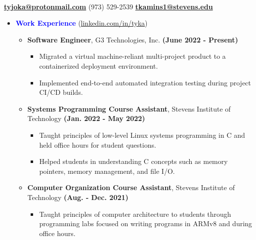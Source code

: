 \documentclass[11pt]{article}
\begin{document}
\begin{flushleft}

    \makebox[\textwidth]{\LARGE \textbf{\textcolor{teal}{Tyler Kaminski}}}\\

\setlength{\parindent}{0.5in}

\begin{multicols}{2}
    \textbf{\href{mailto:tyjoka@protonmail.com}{tyjoka@protonmail.com}} \textemdash{} (973) 529-2539
    \textbf{\href{mailto:tkamins1@stevens.edu}{tkamins1@stevens.edu}}
\end{multicols}

\begin{itemize}
    \item[] \Large \textcolor{blue}{\textbf{Work Experience}} (\href{https://linkedin.com/in/tyka}{linkedin.com/in/tyka}) \normalsize
        \begin{itemize}
            \item \textbf{Software Engineer}, G3 Technologies, Inc. \hfill{\textbf{(June 2022 - Present)}}
                \begin{itemize}
                    \item Migrated a virtual machine-reliant multi-project product to a containerized deployment environment.
                    \item Implemented end-to-end automated integration testing during project CI/CD builds.
                \end{itemize}
            \item \textbf{Systems Programming Course Assistant}, Stevens Institute of Technology \hfill{\textbf{(Jan. 2022 - May 2022)}}
                \begin{itemize}
                    \item Taught principles of low-level Linux systems programming in C and held office hours for student questions.
                    \item Helped students in understanding C concepts such as memory pointers, memory management, and file I/O.
                \end{itemize}
            \item \textbf{Computer Organization Course Assistant}, Stevens Institute of Technology \hfill{\textbf{(Aug. - Dec. 2021)}}
                \begin{itemize}
                    \item Taught principles of computer architecture to students through programming labs focused on writing programs in ARMv8 and during office hours.

\end{itemize}
\end{itemize}
\end{itemize}
\end{flushleft}
\end{document}
